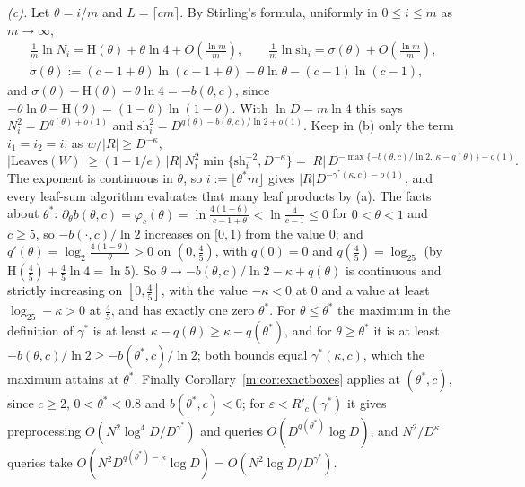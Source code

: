 \documentclass[11pt]{article}
\theoremstyle{definition}
\theoremstyle{remark}
\newcommand{\Hh}{\mathrm{H}}
\newcommand{\Leaves}{\mathrm{Leaves}}
\begin{document}
\emph{(c).} Let $\theta=i/m$ and $L=\lceil cm\rceil$. By Stirling's formula, uniformly in $0\le i\le m$ as $m\to\infty$,
\begin{gather*}
\tfrac1m\ln N_i=\Hh(\theta)+\theta\ln4+O(\tfrac{\ln m}m),\qquad \tfrac1m\ln\mathrm{sh}_i=\sigma(\theta)+O(\tfrac{\ln m}m),\\
\sigma(\theta):=(c-1+\theta)\ln(c-1+\theta)-\theta\ln\theta-(c-1)\ln(c-1),
\end{gather*}
and $\sigma(\theta)-\Hh(\theta)-\theta\ln4=-b(\theta,c)$, since $-\theta\ln\theta-\Hh(\theta)=(1-\theta)\ln(1-\theta)$. With $\ln D=m\ln4$ this says $N_i^2=D^{q(\theta)+o(1)}$ and $\mathrm{sh}_i^2=D^{q(\theta)-b(\theta,c)/\ln2+o(1)}$. Keep in (b) only the term $i_1=i_2=i$; as $w/|R|\ge D^{-\kappa}$,
\[
|\Leaves(W)|\ge(1-1/e)\,|R|\,N_i^2\min\{\mathrm{sh}_i^{-2},D^{-\kappa}\}=|R|\,D^{-\max\{-b(\theta,c)/\ln2,\ \kappa-q(\theta)\}-o(1)}.
\]
The exponent is continuous in $\theta$, so $i:=\lfloor\theta^*m\rfloor$ gives $|R|D^{-\gamma^*(\kappa,c)-o(1)}$, and every leaf-sum algorithm evaluates that many leaf products by (a). The facts about $\theta^*$: $\partial_\theta b(\theta,c)=\varphi_c(\theta)=\ln\frac{4(1-\theta)}{c-1+\theta}<\ln\frac4{c-1}\le0$ for $0<\theta<1$ and $c\ge5$, so $-b(\cdot,c)/\ln2$ increases on $[0,1)$ from the value $0$; and $q'(\theta)=\log_2\frac{4(1-\theta)}\theta>0$ on $(0,\frac45)$, with $q(0)=0$ and $q(\frac45)=\log_25$ (by $\Hh(\frac45)+\frac45\ln4=\ln5$). So $\theta\mapsto-b(\theta,c)/\ln2-\kappa+q(\theta)$ is continuous and strictly increasing on $[0,\frac45]$, with the value $-\kappa<0$ at $0$ and a value at least $\log_25-\kappa>0$ at $\frac45$, and has exactly one zero $\theta^*$. For $\theta\le\theta^*$ the maximum in the definition of $\gamma^*$ is at least $\kappa-q(\theta)\ge\kappa-q(\theta^*)$, and for $\theta\ge\theta^*$ it is at least $-b(\theta,c)/\ln2\ge-b(\theta^*,c)/\ln2$; both bounds equal $\gamma^*(\kappa,c)$, which the maximum attains at $\theta^*$. Finally Corollary~\ref{m:cor:exactboxes} applies at $(\theta^*,c)$, since $c\ge2$, $0<\theta^*<0.8$ and $b(\theta^*,c)<0$; for $\varepsilon<R'_c(\gamma^*)$ it gives preprocessing $O(N^2\log^4\!D/D^{\gamma^*})$ and queries $O(D^{q(\theta^*)}\log D)$, and $N^2/D^\kappa$ queries take $O(N^2D^{q(\theta^*)-\kappa}\log D)=O(N^2\log D/D^{\gamma^*})$.
\end{document}
